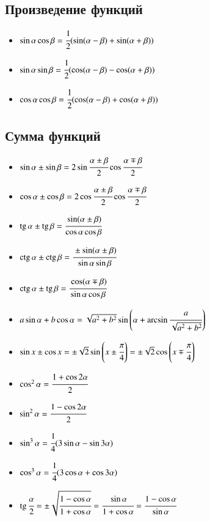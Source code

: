 \documentclass[twoside, a4paperpt, fleqn]{extarticle}
\begin{document}
    \subsection*{Произведение функций}
    \begin{itemize}
        \item $ \sin \alpha \cos \beta=\cfrac{1}{2}(\sin (\alpha-\beta)+\sin (\alpha+\beta))$ 
        \item $ \sin \alpha \sin \beta=\cfrac{1}{2}(\cos (\alpha-\beta)-\cos (\alpha+\beta)) $
        \item $ \cos \alpha \cos \beta=\cfrac{1}{2}(\cos (\alpha-\beta)+\cos (\alpha+\beta))$
    \end{itemize}

    \subsection*{Сумма функций}
    \begin{itemize}
        \item $\sin \alpha \pm \sin \beta=2 \sin \cfrac{\alpha \pm \beta}{2} \cos \cfrac{\alpha \mp \beta}{2} $
        \item $\cos \alpha \pm \cos \beta=2 \cos \cfrac{\alpha \pm \beta}{2} \cos \cfrac{\alpha \mp \beta}{2} $
        \item $\operatorname{tg} \alpha \pm \operatorname{tg} \beta=\cfrac{\sin (\alpha \pm \beta)}{\cos \alpha \cos \beta} $
        \item $\operatorname{ctg} \alpha \pm \operatorname{ctg} \beta=\cfrac{\pm \sin (\alpha \pm \beta)}{\sin \alpha \sin \beta} $
        \item $\operatorname{ctg} \alpha \pm \operatorname{tg} \beta=\cfrac{\cos (\alpha \mp \beta)}{\sin \alpha \cos \beta} $
        \item $a \sin \alpha+b \cos \alpha= \sqrt{a^{2}+b^{2}} \sin \left(\alpha+\arcsin \cfrac{a}{\sqrt{a^{2}+b^{2}}}\right) $
        \item $\sin x \pm \cos x=\pm \sqrt{2} \sin \left(x \pm \cfrac{\pi}{4}\right) =\pm \sqrt{2} \cos \left(x \mp \cfrac{\pi}{4}\right)$
    \end{itemize}


    \begin{itemize}
        \item $ \cos ^{2} \alpha=\cfrac{1+\cos 2 \alpha}{2} $
        \item $ \sin ^{2} \alpha=\cfrac{1-\cos 2 \alpha}{2}$ 
        \item $ \sin ^{3} \alpha=\cfrac{1}{4}(3 \sin \alpha-\sin 3 \alpha) $
        \item $ \cos ^{3} \alpha=\cfrac{1}{4}(3 \cos \alpha+\cos 3 \alpha) $
        \item $\operatorname{tg} \cfrac{\alpha}{2}=\pm \sqrt{\cfrac{1-\cos \alpha}{1+\cos \alpha}}=\cfrac{\sin \alpha}{1+\cos \alpha}=\cfrac{1-\cos \alpha}{\sin \alpha}$
    \end{itemize}
\end{document}
